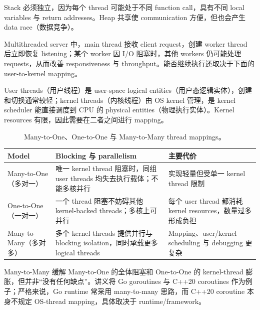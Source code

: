 Stack 必须独立，因为每个 thread 可能处于不同 function call，具有不同 local variables 与 return addresses。Heap 共享使 communication 方便，但也会产生 data race（数据竞争）。

Multithreaded server 中，main thread 接收 client request，创建 worker thread 后立即恢复 listening；某个 worker 因 I/O 阻塞时，其他 workers 仍可能处理 requests，从而改善 responsiveness 与 throughput。能否继续执行还取决于下面的 user-to-kernel mapping。


User threads（用户线程）是 user-space logical entities（用户态逻辑实体），创建和切换通常较轻；kernel threads（内核线程）由 OS kernel 管理，是 kernel scheduler 能直接调度到 CPU 的 physical entities（物理执行实体）。Kernel resources 有限，因此需要在二者之间进行 mapping。

\begin{figure}[htbp]
  \centering
  \resizebox{0.98\textwidth}{!}{}
  \caption{Many-to-One、One-to-One 与 Many-to-Many thread mappings。}
  \label{fig:sc2005-l04-thread-mappings}
\end{figure}

\begin{center}
\small
\begin{tabularx}{\textwidth}{@{}>{\raggedright\arraybackslash}p{3.1cm}>{\raggedright\arraybackslash}p{4.5cm}X@{}}
  \toprule
  Model & Blocking 与 parallelism & 主要代价 \\
  \midrule
  Many-to-One（多对一） & 唯一 kernel thread 阻塞时，同组 user threads 均失去执行载体；不能多核并行 & 实现轻量但受单一 kernel thread 限制 \\
  One-to-One（一对一） & 一个 thread 阻塞不妨碍其他 kernel-backed threads；多核上可并行 & 每个 user thread 都消耗 kernel resources，数量过多形成负担 \\
  Many-to-Many（多对多） & 多个 kernel threads 提供并行与 blocking isolation，同时承载更多 logical threads & Mapping、user/kernel scheduling 与 debugging 更复杂 \\
  \bottomrule
\end{tabularx}
\end{center}

Many-to-Many 缓解 Many-to-One 的全体阻塞和 One-to-One 的 kernel-thread 膨胀，但并非“没有任何缺点”。讲义将 Go goroutines 与 C++20 coroutines 作为例子；严格来说，Go runtime 常采用 many-to-many 思路，而 C++20 coroutine 本身不规定 OS-thread mapping，具体取决于 runtime/framework。

